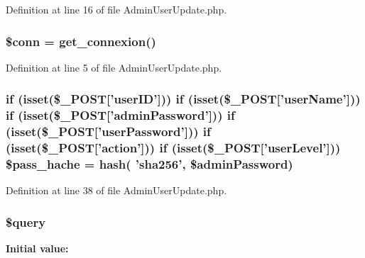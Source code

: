 Definition at line 16 of file Admin\-User\-Update.\-php.

\hypertarget{_admin_user_update_8php_aa8a5a87b9c1a6a0819b88447cbe41877}{
\subsubsection[{\$conn}]{\setlength{\rightskip}{0pt plus 5cm}\$conn = {\bf get\-\_\-connexion}()}}\label{_admin_user_update_8php_aa8a5a87b9c1a6a0819b88447cbe41877}


Definition at line 5 of file Admin\-User\-Update.\-php.

\hypertarget{_admin_user_update_8php_a844eaca485688be8060f60120beede86}{
\subsubsection[{\$pass\-\_\-hache}]{\setlength{\rightskip}{0pt plus 5cm}if (isset(\$\-\_\-\-P\-O\-S\-T\mbox{[}'user\-I\-D'\mbox{]})) if (isset(\$\-\_\-\-P\-O\-S\-T\mbox{[}'user\-Name'\mbox{]})) if (isset(\$\-\_\-\-P\-O\-S\-T\mbox{[}'admin\-Password'\mbox{]})) if (isset(\$\-\_\-\-P\-O\-S\-T\mbox{[}'user\-Password'\mbox{]})) if (isset(\$\-\_\-\-P\-O\-S\-T\mbox{[}'action'\mbox{]})) if (isset(\$\-\_\-\-P\-O\-S\-T\mbox{[}'user\-Level'\mbox{]})) \$pass\-\_\-hache = hash( 'sha256', \$admin\-Password)}}\label{_admin_user_update_8php_a844eaca485688be8060f60120beede86}


Definition at line 38 of file Admin\-User\-Update.\-php.

\hypertarget{_admin_user_update_8php_af59a5f7cd609e592c41dc3643efd3c98}{
\subsubsection[{\$query}]{\setlength{\rightskip}{0pt plus 5cm}\$query}}\label{_admin_user_update_8php_af59a5f7cd609e592c41dc3643efd3c98}
{\bfseries Initial value\-:}



